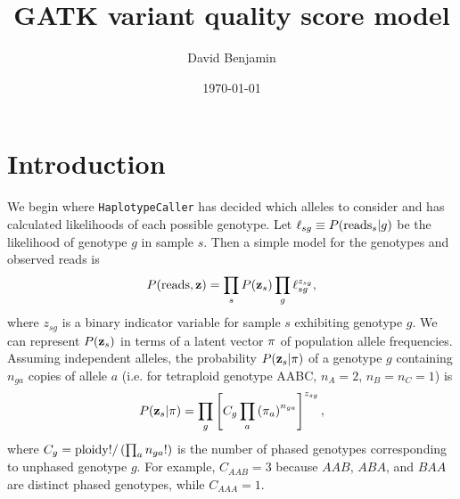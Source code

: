 \documentclass[nofootinbib,amssymb,amsmath]{revtex4}
\newcommand{\vz}{{\bf z}}
\newcommand{\vpi}{{\bf \pi}}
\newcommand{\code}[1]{\texttt{#1}}
\begin{document}
\title{GATK variant quality score model}
\author{David Benjamin}

\date{\today}

\maketitle

\section{Introduction}\label{introduction}

We begin where \code{HaplotypeCaller} has decided which alleles to consider and has calculated likelihoods of each possible genotype.  Let $\ell_{sg} \equiv P({\rm reads}_s | g)$ be the likelihood of genotype $g$ in sample $s$.  Then a simple model for the genotypes and observed reads is
\begin{equation}
P({\rm reads}, \vz) = \prod_s P(\vz_s) \prod_g \ell_{sg}^{z_{sg}}, \label{likelihood}
\end{equation}
where $z_{sg}$ is a binary indicator variable for sample $s$ exhibiting genotype $g$.  We can represent $P(\vz_s)$ in terms of a latent vector $\vpi$ of population allele frequencies.  Assuming independent alleles, the probability $P(\vz_s | \vpi)$ of a genotype $g$ containing $n_{ga}$ copies of allele $a$ (i.e. for tetraploid genotype AABC, $n_A = 2$, $n_B = n_C = 1$) is 
\begin{equation}
P(\vz_s| \vpi) = \prod_g \left[ C_g \prod_a \left( \pi_a \right)^{n_{ga}} \right]^{z_{sg}},
\label{indicator}
\end{equation}
where $C_g = {\rm ploidy}! / \left(\prod_a n_{ga}! \right)$ is the number of phased genotypes corresponding to unphased genotype $g$.  For example, $C_{AAB} = 3$ because $AAB$, $ABA$, and $BAA$ are distinct phased genotypes, while $C_{AAA} = 1$.
\end{document}
